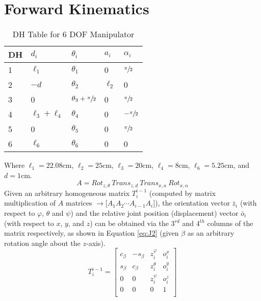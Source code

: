 \documentclass[12pt]{report}
\begin{document}
\section{Forward Kinematics}
% 
\begin{table}[htp]
  \center
  \caption{DH Table for 6 DOF Manipulator}
  \label{table:dh}
  \begin{tabular}{C{1cm}|C{1.5cm}|C{2cm}|C{1cm}|C{1cm}}
    DH & $d_i$ & $\theta_i$ & $a_i$ & $\alpha_i$ \\  & $\ell_1$ & $\theta_1$ & 0 & $\sfrac{\pi}{2}$ \\
    2 & $-d$ & $\theta_2$ & $\ell_2$ & 0 \\
    3 & 0 & $\theta_3 + \sfrac{\pi}{2}$ & 0 & $\sfrac{\pi}{2}$ \\
    4 & $\ell_3 + \ell_4$ & $\theta_4$ & 0 & $-\sfrac{\pi}{2}$ \\
    5 & 0 & $\theta_5$ & 0 & $\sfrac{\pi}{2}$ \\
    6 & $\ell_6$ & $\theta_6$ & 0 & 0 \\
  \end{tabular}
\end{table}
Where \(\ell_1 = 22.08\)cm, \(\ell_2 = 25\)cm, \(\ell_3 = 20\)cm, \(\ell_4 = 8\)cm, \(\ell_6 = 5.25\)cm, and \(d = 1\)cm.
\begin{equation}
A = Rot_{z,\theta}~Trans_{z,d}~Trans_{x,a}~Rot_{x,\alpha}
\label{eq:J1}
\end{equation}%
Given an arbitrary homogeneous matrix $T_i^{i-1}$ (computed by matrix multiplication of $A$ matrices $\rightarrow \big[A_1A_2\cdots A_{i-1}A_i\big]$), the orientation vector $\bar{z}_i$ (with respect to $\varphi$, $\theta$ and $\psi$) and the relative joint position (displacement) vector $\bar{o}_i$ (with respect to $x$, $y$, and $z$) can be obtained via the 3$^{rd}$ and 4$^{th}$ columns of the matrix respectively,
as shown in Equation \ref{eq:J2} (given $\beta$ as an arbitrary rotation angle about the $z$-axis).
\begin{equation}
  T_i^{i-1} =
\begin{bmatrix}
  c_{\beta} & -s_{\beta} & z_i^{\varphi} & o_i^x \\
  s_{\beta} & c_{\beta} & z_i^{\theta} & o_i^y \\
  0 & 0 & z_i^{\psi} & o_i^z \\
  0 & 0 & 0 & 1 \\
\end{bmatrix}
\label{eq:J2}
\end{equation}
\end{document}
